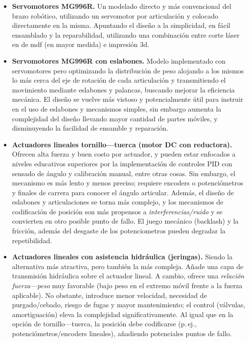 \begin{itemize}
  \item \textbf{Servomotores MG996R.} Un modelado directo y más convencional del brazo robótico, utilizando un servomotor por articulación y colocado directamente en la misma. Apuntando el diseño a la simplicidad, en fácil ensamblado y la reparabilidad, utilizando una combinación entre corte láser en de mdf (en mayor medida) e impresión 3d.
  
  \item \textbf{Servomotores MG996R con eslabones.} Modelo implementado con servomotores pero optimizando la distribución de peso alojando a los mismos lo más cerca del eje de rotación de cada articulación y transmitiendo el movimiento mediante eslabones y palancas, buscando mejorar la eficiencia mecánica. El diseño se vuelve más vistoso y potencialmente útil para instruir en el uso de eslabones y mecanismos simples, sin embargo aumenta la complejidad del diseño llevando mayor cantidad de partes móviles, y disminuyendo la facilidad de ensamble y reparación.

  \item \textbf{Actuadores lineales tornillo---tuerca (motor DC con reductora).} Ofrecen alta fuerza y buen costo por actuador, y pueden estar enfocados a niveles educativos superiores por la implementación de controles PID con sensado de ángulo y calibración manual, entre otras cosas. Sin embargo, el mecanismo es más lento y menos preciso; requiere encoders o potenciómetros y finales de carrera para conocer el ángulo articular. Además, el diseño de eslabones y articulaciones se torna más complejo,  y los mecanismos de codificación de posición son más propensos a \emph{interferencias/ruido} y se convierten en otro posible punto de fallo. El juego mecánico (backlash) y la fricción, además del desgaste de los potenciometros pueden degradar la repetibilidad.

  \item \textbf{Actuadores lineales con asistencia hidráulica (jeringas).} Siendo la alternativa más atractiva, pero también la más compleja. Añade una capa de transmisión hidráulica sobre el actuador lineal. A cambio, ofrece una \emph{relación fuerza---peso} muy favorable (bajo peso en el extremo móvil frente a la fuerza aplicable). No obstante, introduce menor velocidad, necesidad de purgado/cebado, riesgo de fugas y mayor mantenimiento; el control (válvulas, amortiguación) eleva la complejidad significativamente. Al igual que en la opción de tornillo---tuerca, la posición debe codificarse (p.\,ej., potenciómetros/encoders lineales), añadiendo potenciales puntos de fallo.
\end{itemize}


